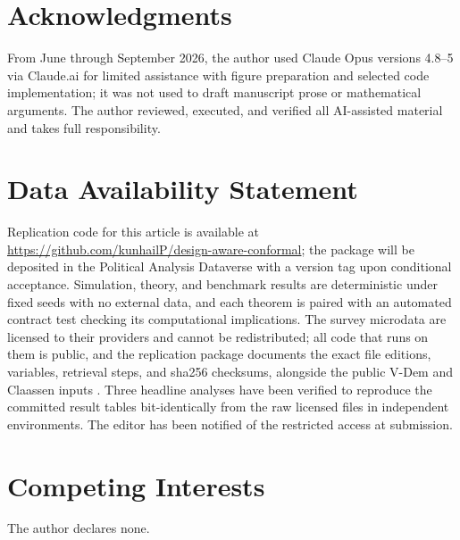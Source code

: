 \documentclass[12pt]{article}
\theoremstyle{definition}
\theoremstyle{remark}
\begin{document}
\section*{Acknowledgments}
From June through September 2026, the author used Claude Opus versions
4.8--5 via Claude.ai for limited assistance with figure preparation and
selected code implementation; it was not used to draft manuscript prose or
mathematical arguments. The author reviewed, executed, and verified all
AI-assisted material and takes full responsibility.

\section*{Data Availability Statement}
Replication code for this article is available at
\url{https://github.com/kunhailP/design-aware-conformal}; the package will be
deposited in the Political Analysis Dataverse with a version tag upon
conditional acceptance. Simulation, theory, and benchmark results are
deterministic under fixed seeds with no external data, and each theorem is
paired with an automated contract test checking its computational
implications. The survey microdata
\citep{essdata2024,wvsdata2024,lapopdata2023} are licensed to their providers
and cannot be redistributed; all code that runs on them is public, and the
replication package documents the exact file editions, variables, retrieval
steps, and sha256 checksums, alongside the public V-Dem and Claassen inputs
\citep{vdemdata2025,claassendata2020}. Three headline analyses have been
verified to reproduce the committed result tables bit-identically from the raw
licensed files in independent environments. The editor has been notified
of the restricted access at submission.

\section*{Competing Interests}
The author declares none.



\end{document}
